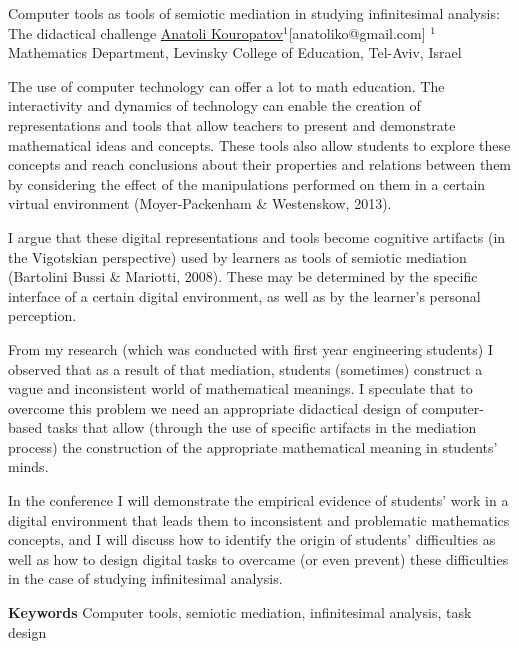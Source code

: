 


\begin{abstract_online}{Computer tools as tools of semiotic mediation in
studying infinitesimal analysis: The didactical challenge}{%
        \underline{Anatoli Kouropatov}$^{1}$}{[anatoliko@gmail.com]
        }{%
        $^1$ Mathematics Department, Levinsky College of Education,
Tel-Aviv, Israel}
    
The use of computer technology can offer a lot to math education. The
interactivity and dynamics of technology can enable the creation of
representations and tools that allow teachers to present and demonstrate
mathematical ideas and concepts. These tools also allow students to
explore these concepts and reach conclusions about their properties and
relations between them by considering the effect of the manipulations
performed on them in a certain virtual environment (Moyer-Packenham \&
Westenskow, 2013).

I argue that these digital representations and tools become cognitive
artifacts (in the Vigotskian perspective) used by learners as tools
of semiotic mediation (Bartolini Bussi \& Mariotti, 2008). These may be
determined by the specific interface of a certain digital environment,
as well as by the learner’s personal perception.

From my research (which was conducted with first year engineering
students) I observed that as a result of that mediation, students
(sometimes) construct a vague and inconsistent world of mathematical
meanings. I speculate that to overcome this problem we need an appropriate
didactical design of computer-based tasks that allow (through the use
of specific artifacts in the mediation process) the construction of the
appropriate mathematical meaning in students' minds.

In the conference I will demonstrate the empirical evidence of students'
work in a digital environment that leads them to inconsistent and
problematic mathematics concepts, and I will discuss how to identify
the origin of students' difficulties as well as how to design digital
tasks to overcame (or even prevent) these difficulties in the case of
studying infinitesimal analysis.

\textbf{Keywords} \newline{} Computer tools, semiotic mediation,
infinitesimal analysis, task design


\end{abstract_online}
